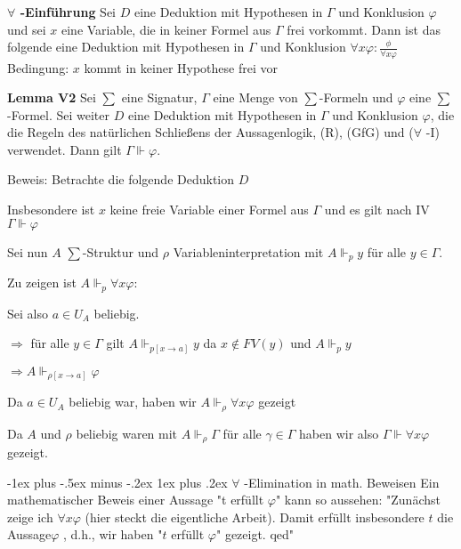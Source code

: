 \documentclass[a4paper]{article}
\makeatletter
\renewcommand{\note}[2]{\begin{noteBox} \textbf{#1} #2 \end{noteBox}}
\renewcommand{\subsubsection}{\@startsection{subsubsection}{3}{0mm}%
                {-1ex plus -.5ex minus -.2ex}%
                {1ex plus .2ex}%
                {\normalfont\small\bfseries}}
\makeatother
\begin{document}
\begin{multicols}{3}
  \note{ $\forall$ -Einführung}{ Sei $D$ eine Deduktion mit Hypothesen in $\Gamma$ und Konklusion $\varphi$ und sei $x$ eine Variable, die in keiner Formel aus $\Gamma$ frei vorkommt. Dann ist das folgende eine Deduktion
    mit Hypothesen in $\Gamma$ und Konklusion $\forall x\varphi: \frac{\phi}{\forall x\varphi}$
    Bedingung: $x$ kommt in keiner Hypothese frei vor}

  \note{Lemma V2}{Sei $\sum$ eine Signatur, $\Gamma$ eine Menge von $\sum$-Formeln und $\varphi$ eine $\sum$-Formel. Sei weiter $D$ eine Deduktion mit Hypothesen in $\Gamma$ und Konklusion $\varphi$, die die Regeln des natürlichen Schließens der Aussagenlogik, (R), (GfG) und ($\forall$ -I) verwendet. Dann gilt $\Gamma\Vdash\varphi$.}

  Beweis: Betrachte die folgende Deduktion $D$
  \begin{itemize*}
    \item Insbesondere ist $x$ keine freie Variable einer Formel aus $\Gamma$ und es gilt nach IV $\Gamma\Vdash\varphi$
    \item Sei nun $A$ $\sum$-Struktur und $\rho$ Variableninterpretation mit $A\Vdash_p y$ für alle $y\in\Gamma$.
    \item Zu zeigen ist $A\Vdash_p \forall x\varphi$:
    \begin{itemize*}
      \item Sei also $a\in U_A$ beliebig.
      \item $\Rightarrow$ für alle $y\in\Gamma$ gilt $A\Vdash_{p[x\rightarrow a]} y$ da $x\not\in FV(y)$ und $A\Vdash_p y$
      \item $\Rightarrow A\Vdash_{\rho[x\rightarrow a]}\varphi$
      \item Da $a\in U_A$ beliebig war, haben wir $A\Vdash_\rho\forall x\varphi$ gezeigt
    \end{itemize*}
    \item Da $A$ und $\rho$ beliebig waren mit $A\Vdash_\rho\Gamma$ für alle $\gamma\in\Gamma$ haben wir also $\Gamma\Vdash\forall x\varphi$ gezeigt.
  \end{itemize*}

  \subsubsection{$\forall$ -Elimination in math. Beweisen}
  Ein mathematischer Beweis einer Aussage "t erfüllt $\varphi$" kann so aussehen:
  "Zunächst zeige ich $\forall x\varphi$ (hier steckt die eigentliche Arbeit). Damit erfüllt insbesondere $t$ die Aussage$\varphi$ , d.h., wir haben "$t$ erfüllt $\varphi$" gezeigt. qed"


\end{multicols}
\end{document}
